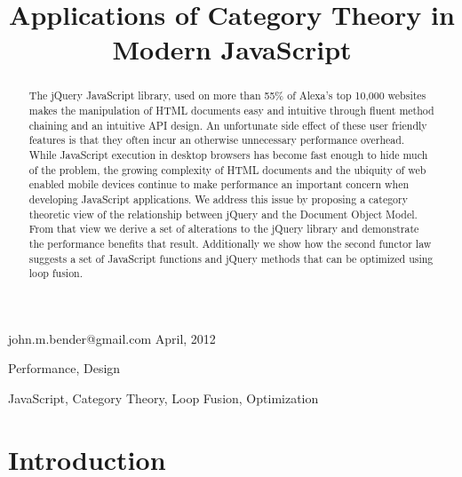 \documentclass[preprint, leqno]{sigplanconf}
\begin{document}
\copyrightdata{[to be supplied]}


\title{Applications of Category Theory in Modern JavaScript}

           {john.m.bender@gmail.com}
           {April, 2012}

\maketitle

\begin{abstract}
The jQuery JavaScript library, used on more than 55\% of Alexa's top 10,000 websites \cite{bib:usage} makes the manipulation of HTML documents easy and intuitive through fluent method chaining and an intuitive API design. An unfortunate side effect of these user friendly features is that they often incur an otherwise unnecessary performance overhead. While JavaScript execution in desktop browsers has become fast enough to hide much of the problem, the growing complexity of HTML documents and the ubiquity of web enabled mobile devices continue to make performance an important concern when developing JavaScript applications. We address this issue by proposing a category theoretic view of the relationship between jQuery and the Document Object Model. From that view we derive a set of alterations to the jQuery library and demonstrate the performance benefits that result. Additionally we show how the second functor law suggests a set of JavaScript functions and jQuery methods that can be optimized using loop fusion.
\end{abstract}


\terms
Performance, Design

\keywords
JavaScript, Category Theory, Loop Fusion, Optimization

\section{Introduction}
\end{document}
